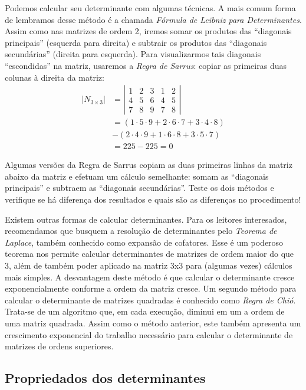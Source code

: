 \documentclass[
  letterpaper,
  DIV=11,
  numbers=noendperiod]{scrreprt}
\begin{document}
Podemos calcular seu determinante com algumas técnicas. A mais comum
forma de lembramos desse método é a chamada \emph{Fórmula de Leibniz
para Determinantes}. Assim como nas matrizes de ordem 2, iremos somar os
produtos das ``diagonais principais'' (esquerda para direita) e subtrair
os produtos das ``diagonais secundárias'' (direita para esquerda). Para
visualizarmos tais diagonais ``escondidas'' na matriz, usaremos a
\emph{Regra de Sarrus}: copiar as primeiras duas colunas à direita da
matriz: \[
\begin{aligned}
    |N_{3\times3}| &=
    \left|\begin{array}{ccc|cc}
        1 & 2 & 3 & 1 & 2 \\ 
        4 & 5 & 6 & 4 & 5 \\
        7 & 8 & 9 & 7 & 8
    \end{array}\right| \\
    &= (1 \cdot 5 \cdot 9 + 2 \cdot 6 \cdot 7 + 3 \cdot 4 \cdot 8) \\
    &- (2 \cdot 4 \cdot 9 + 1 \cdot 6 \cdot 8 + 3 \cdot 5 \cdot 7)\\
    &= 225 - 225 = 0
\end{aligned}
\]

Algumas versões da Regra de Sarrus copiam as duas primeiras linhas da
matriz abaixo da matriz e efetuam um cálculo semelhante: somam as
``diagonais principais'' e subtraem as ``diagonais secundárias''. Teste
os dois métodos e verifique se há diferença dos resultados e quais são
as diferenças no procedimento!

Existem outras formas de calcular determinantes. Para os leitores
interesados, recomendamos que busquem a resolução de determinantes pelo
\emph{Teorema de Laplace}, também conhecido como expansão de cofatores.
Esse é um poderoso teorema nos permite calcular determinantes de
matrizes de ordem maior do que 3, além de também poder aplicado na
matriz 3x3 para (algumas vezes) cálculos mais simples. A desvantagem
deste método é que calcular o determinante cresce exponencialmente
conforme a ordem da matriz cresce. Um segundo método para calcular o
determinante de matrizes quadradas é conhecido como \emph{Regra de
Chió}. Trata-se de um algoritmo que, em cada execução, diminui em um a
ordem de uma matriz quadrada. Assim como o método anterior, este também
apresenta um crescimento exponencial do trabalho necessário para
calcular o determinante de matrizes de ordens superiores.

\subsection{Propriedados dos
determinantes}\label{propriedados-dos-determinantes}
\end{document}
